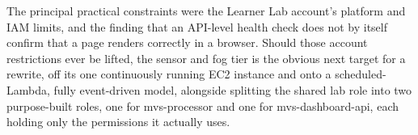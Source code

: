 \documentclass[conference]{IEEEtran}
\begin{document}
The principal practical constraints were the Learner Lab account's platform and IAM limits, and the finding that an API-level health check does not by itself confirm that a page renders correctly in a browser. Should those account restrictions ever be lifted, the sensor and fog tier is the obvious next target for a rewrite, off its one continuously running EC2 instance and onto a scheduled-Lambda, fully event-driven model, alongside splitting the shared lab role into two purpose-built roles, one for mvs-processor and one for mvs-dashboard-api, each holding only the permissions it actually uses.



\end{document}
